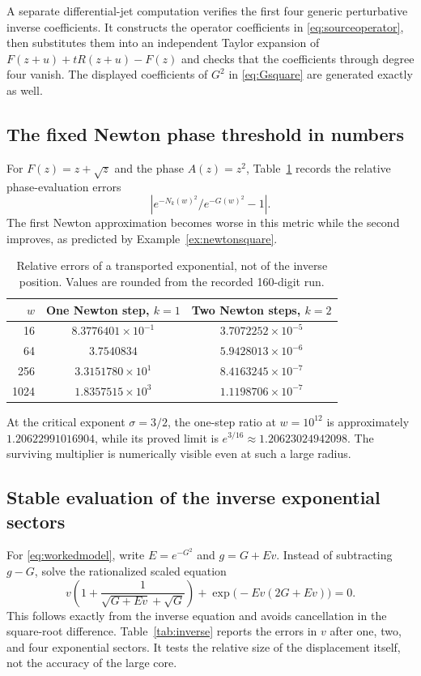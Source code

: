\documentclass[11pt,a4paper]{article}
\theoremstyle{definition}
\theoremstyle{remark}
\numberwithin{equation}{section}
\begin{document}
A separate differential-jet computation verifies the first four generic perturbative inverse coefficients. It constructs the operator coefficients in \eqref{eq:sourceoperator}, then substitutes them into an independent Taylor expansion of $F(z+u)+tR(z+u)-F(z)$ and checks that the coefficients through degree four vanish. The displayed coefficients of $G^2$ in \eqref{eq:Gsquare} are generated exactly as well.

\subsection{The fixed Newton phase threshold in numbers}

For $F(z)=z+\sqrt z$ and the phase $A(z)=z^2$, Table~\ref{tab:phase} records the relative phase-evaluation errors
\[
 \left|e^{-N_k(w)^2}/e^{-G(w)^2}-1\right|.
\]
The first Newton approximation becomes worse in this metric while the second improves, as predicted by Example~\ref{ex:newtonsquare}.

\begin{table}[htbp]
\centering
\begin{tabular}{@{}rcc@{}}
\toprule
$w$ & One Newton step, $k=1$ & Two Newton steps, $k=2$\\
\midrule
16 & $8.3776401\times10^{-1}$ & $3.7072252\times10^{-5}$\\
64 & $3.7540834$ & $5.9428013\times10^{-6}$\\
256 & $3.3151780\times10^{1}$ & $8.4163245\times10^{-7}$\\
1024 & $1.8357515\times10^{3}$ & $1.1198706\times10^{-7}$\\
\bottomrule
\end{tabular}
\caption{Relative errors of a transported exponential, not of the inverse position. Values are rounded from the recorded 160-digit run.}\label{tab:phase}
\end{table}

At the critical exponent $\sigma=3/2$, the one-step ratio at $w=10^{12}$ is approximately $1.20622991016904$, while its proved limit is
$e^{3/16}\approx1.20623024942098$. The surviving multiplier is numerically visible even at such a large radius.

\subsection{Stable evaluation of the inverse exponential sectors}

For \eqref{eq:workedmodel}, write $E=e^{-G^2}$ and $g=G+Ev$. Instead of subtracting $g-G$, solve the rationalized scaled equation
\begin{equation}\label{eq:stableeq}
 v\left(1+\frac1{\sqrt{G+Ev}+\sqrt G}\right)
 +\exp\bigl(-Ev(2G+Ev)\bigr)=0.
\end{equation}
This follows exactly from the inverse equation and avoids cancellation in the square-root difference. Table~\ref{tab:inverse} reports the errors in $v$ after one, two, and four exponential sectors. It tests the relative size of the displacement itself, not the accuracy of the large core.
\end{document}
